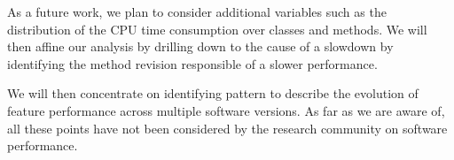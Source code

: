 \documentclass[10pt, conference, compsocconf]{IEEEtran}
\begin{document}
As a future work, we plan to consider additional variables such as the distribution of the CPU time consumption over classes and methods. We will then affine our analysis by drilling down to the cause of a slowdown by identifying the method revision responsible of a slower performance.

We will then concentrate on identifying pattern to describe the evolution of feature performance across multiple software versions. As far as we are aware of, all these points have not been considered by the research community on software performance.





\end{document}
